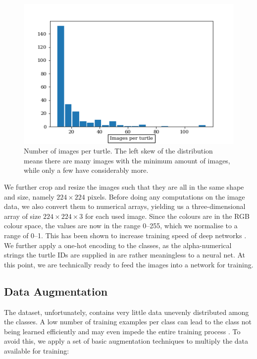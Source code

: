 \begin{figure}[h]
    \centering
    \includegraphics[width=12cm]{images/images_per_turtle.png}
    \caption[Number of images per turtle]{Number of images per turtle. The left skew of the distribution means there are many images with the minimum amount of images, while only a few have considerably more.}
    \label{fig:images_per_turtle}
\end{figure}

We further crop and resize the images such that they are all in the same shape and size, namely $224\times224$ pixels. Before doing any computations on the image data, we also convert them to numerical arrays, yielding us a three-dimensional array of size $224\times224\times3$ for each used image. Since the colours are in the RGB colour space, the values are now in the range \numrange{0}{255}, which we normalise to a range of \numrange{0}{1}. This has been shown to increase training speed of deep networks \citep{Ioffe2015}. We further apply a one-hot encoding to the classes, as the alpha-numerical strings the turtle IDs are supplied in are rather meaningless to a neural net. At this point, we are technically ready to feed the images into a network for training.


\subsection{Data Augmentation}
The dataset, unfortunately, contains very little data unevenly distributed among the classes. A low number of training examples per class can lead to the class not being learned efficiently and may even impede the entire training process \citep{Huh2016}. To avoid this, we apply a set of basic augmentation techniques to multiply the data available for training:

